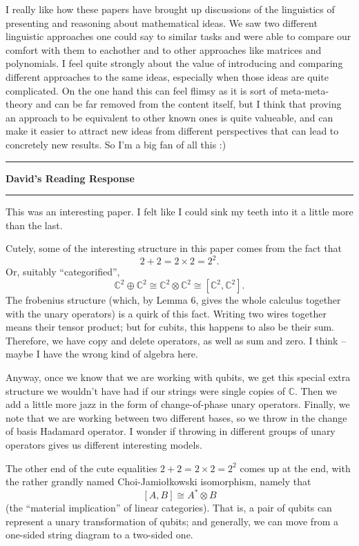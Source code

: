 \documentclass{amsart}
\newcommand{\iam}[1]{
  \vspace{0.25em}
  \hrule
  \vspace{0.25em}
  \textbf{{#1}'s Reading Response}
  \vspace{0.25em}
  \hrule
  \vspace{1em}
}
\begin{document}
I really like how these papers have brought up discussions of the linguistics of presenting and reasoning about mathematical ideas.  We saw two different linguistic approaches one could say to similar tasks and were able to compare our comfort with them to eachother and to other approaches like matrices and polynomials.  I feel quite strongly about the value of introducing and comparing different approaches to the same ideas, especially when those ideas are quite complicated.  On the one hand this can feel flimsy as it is sort of meta-meta-theory and can be far removed from the content itself, but I think that proving an approach to be equivalent to other known ones is quite valueable, and can make it easier to attract new ideas from different perspectives that can lead to concretely new results.  So I'm a big fan of all this :)

\iam{David}

This was an interesting paper. I felt like I could sink my teeth into it a little more than the last.

Cutely, some of the interesting structure in this paper comes from the fact that
$$2 + 2 = 2 \times 2 = 2^2.$$
Or, suitably ``categorified'',
$$\mathbb{C}^2 \oplus \mathbb{C}^2 \cong \mathbb{C}^2 \otimes \mathbb{C}^2 \cong [\mathbb{C}^2, \mathbb{C}^2].$$
The frobenius structure (which, by Lemma 6, gives the whole calculus together with the unary operators) is a quirk of this fact. Writing two wires together means their tensor product; but for cubits, this happens to also be their sum. Therefore, we have copy and delete operators, as well as sum and zero. I think -- maybe I have the wrong kind of algebra here.

Anyway, once we know that we are working with qubits, we get this special extra structure we wouldn't have had if our strings were single copies of $\mathbb{C}$. Then we add a little more jazz in the form of change-of-phase unary operators. Finally, we note that we are working between two different bases, so we throw in the change of basis Hadamard operator. I wonder if throwing in different groups of unary operators gives us different interesting models.

The other end of the cute equalities $2 + 2 = 2 \times 2 = 2^2$ comes up at the end, with the rather grandly named Choi-Jamio\l{}kowski isomorphism, namely that
$$[A, B] \cong A^{\ast} \otimes B$$
(the ``material implication'' of linear categories). That is, a pair of qubits can represent a unary transformation of qubits; and generally, we can move from a one-sided string diagram to a two-sided one.
\end{document}
